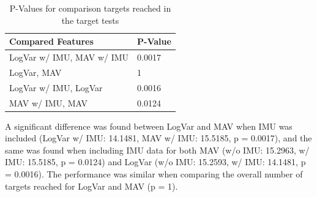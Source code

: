 	\begin{table}[!thpb]
		\begin{center}
			\begin{tabular}{l l}
				\hline
				\textbf{Compared Features} & \textbf{P-Value}\\
				\hline
				LogVar w/ IMU, MAV w/ IMU & 0.0017 \\
				LogVar, MAV & 1 \\
				LogVar w/ IMU, LogVar & 0.0016 \\
				MAV w/ IMU, MAV & 0.0124 \\
				\hline
			\end{tabular}
			\caption{P-Values for comparison targets reached in the target tests}
		\end{center}
	\end{table}
	
	A significant difference was found between LogVar and MAV when IMU was included (LogVar w/ IMU: 14.1481, MAV w/ IMU: 15.5185, p = 0.0017), and the same was found when including IMU data for both MAV (w/o IMU: 15.2963, w/ IMU: 15.5185, p = 0.0124) and LogVar (w/o IMU: 15.2593, w/ IMU: 14.1481, p = 0.0016). The performance was similar when comparing the overall number of targets reached for LogVar and MAV (p = 1).
	
	
	
	
	
	
	
	
